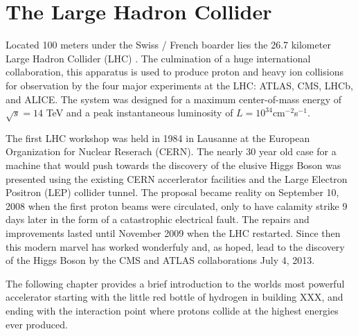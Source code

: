\chapter{The Large Hadron Collider} \label{chap:lhc}

Located 100 meters under the Swiss / French boarder lies the 26.7 kilometer
Large Hadron Collider (LHC) \cite{Evans:2008zzb}.  The culmination of a huge international collaboration,
this apparatus is used to produce proton and heavy ion collisions for observation by
the four major experiments at the LHC: ATLAS, CMS, LHCb, and ALICE.  The system
was designed for a maximum center-of-mass  energy of $\sqrt{s} = 14$ TeV and a peak
instantaneous luminosity of $L = 10^{34} $cm$^{-2} $s$^{-1}$.  

The first LHC workshop was held in 1984 in Lausanne at the European Organization
for  Nuclear Reserach (CERN).  The nearly 30 year old case for a machine that 
would push towards the discovery of the elusive Higgs Boson was presented using
the existing CERN accerlerator facilities and the Large Electron Positron (LEP)
collider tunnel. The proposal became reality on September 10, 2008 when the
first proton beams were circulated, only to have calamity strike 9 days later in
the form of a catastrophic electrical fault. The repairs and improvements lasted
until November 2009 when the LHC restarted.  Since then this modern marvel has
worked wonderfuly and, as hoped, lead to the discovery of the Higgs Boson by the
CMS and ATLAS collaborations July 4, 2013.

The following  chapter provides a brief introduction to the worlds
most powerful accelerator starting with the little red bottle of hydrogen in 
building XXX, and ending with the interaction point where protons collide at the 
highest energies ever produced.





